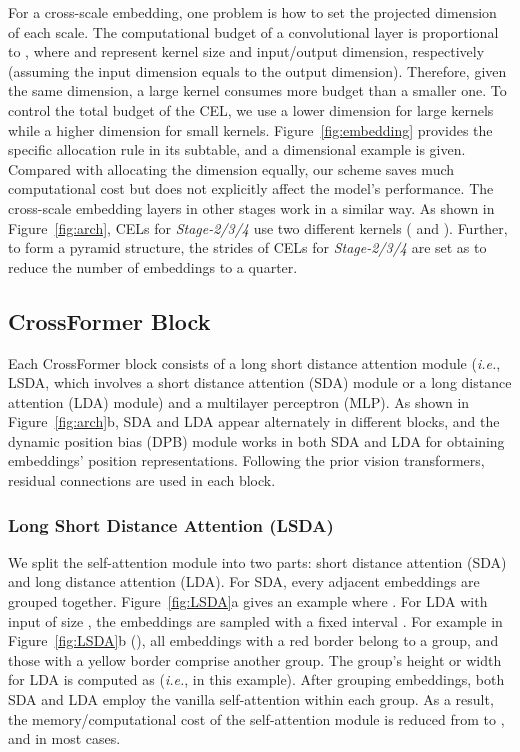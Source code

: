 \documentclass{article} \usepackage{iclr2022_conference,times}
\newcommand{\ie}{{\emph{i.e.}}}
\begin{document}
For a cross-scale embedding, one problem is how to set the projected dimension of each scale.
The computational budget of a convolutional layer is proportional to , where  and  represent kernel size and input/output dimension, respectively (assuming the input dimension equals to the output dimension).
Therefore, given the same dimension, a large kernel consumes more budget than a smaller one.
To control the total budget of the CEL, we use a lower dimension for large kernels while a higher dimension for small kernels.
Figure~\ref{fig:embedding} provides the specific allocation rule in its subtable, and a  dimensional example is given.
Compared with allocating the dimension equally, our scheme saves much computational cost but does not explicitly affect the model's performance.
The cross-scale embedding layers in other stages work in a similar way. As shown in Figure~\ref{fig:arch}, CELs for \textit{Stage-2/3/4} use two different kernels ( and ). Further, to form a pyramid structure, the strides of CELs for \textit{Stage-2/3/4} are set as  to reduce the number of embeddings to a quarter.

\vspace{-2mm}
\subsection{CrossFormer Block}  \label{sec:block}
\vspace{-1mm}

Each CrossFormer block consists of a long short distance attention module (\ie, LSDA, which involves a short distance attention (SDA) module or a long distance attention (LDA) module) and a multilayer perceptron (MLP).
As shown in Figure~\ref{fig:arch}b, SDA and LDA appear alternately in different blocks, and the dynamic position bias (DPB) module works in both SDA and LDA for obtaining embeddings' position representations.
Following the prior vision transformers, residual connections are used in each block.

\vspace{-2mm}
\subsubsection{Long Short Distance Attention (LSDA)}
\vspace{-1mm}

We split the self-attention module into two parts: short distance attention (SDA) and long distance attention (LDA).
For SDA, every  adjacent embeddings are grouped together. Figure~\ref{fig:LSDA}a gives an example where .
For LDA with input of size , the embeddings are sampled with a fixed interval . For example in Figure~\ref{fig:LSDA}b (), all embeddings with a red border belong to a group, and those with a yellow border comprise another group. The group's height or width for LDA is computed as  (\ie,  in this example). After grouping embeddings, both SDA and LDA employ the vanilla self-attention within each group. As a result, the memory/computational cost of the self-attention module is reduced from  to , and  in most cases.
\end{document}
